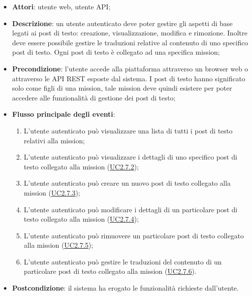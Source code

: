 \begin{itemize}
\item \textbf{Attori}: utente web, utente API;
\item \textbf{Descrizione}: un utente autenticato deve poter gestire gli aspetti di base legati ai post di testo: creazione, visualizzazione, modifica e rimozione. Inoltre deve essere possibile gestire le traduzioni relative al contenuto di uno specifico post di testo. Ogni post di testo è collegato ad una specifica mission; 
      \item \textbf{Precondizione}: l'utente accede alla piattaforma attraverso un browser web o attraverso le API REST esposte dal sistema. I post di testo hanno significato solo come figli di una mission, tale mission deve quindi esistere per poter accedere alle funzionalità di gestione dei post di testo;

        \item \textbf{Flusso principale degli eventi}:
          \begin{enumerate}
          \item L'utente autenticato può visualizzare una lista di tutti i post di testo relativi alla mission;
          \item L'utente autenticato può visualizzare i dettagli di uno specifico post di testo collegato alla mission (\hyperlink{UC2.7.2}{UC2.7.2});
          \item L'utente autenticato può creare un nuovo post di testo collegato alla mission (\hyperlink{UC2.7.3}{UC2.7.3});
          \item L'utente autenticato può modificare i dettagli di un particolare post di testo collegato alla mission (\hyperlink{UC2.7.4}{UC2.7.4});
          \item L'utente autenticato può rimuovere un particolare post di testo collegato alla mission (\hyperlink{UC2.7.5}{UC2.7.5});
          \item L'utente autenticato può gestire le traduzioni del contenuto di un particolare post di testo collegato alla mission (\hyperlink{UC2.7.6}{UC2.7.6}).

      \end{enumerate}
    \item \textbf{Postcondizione}: il sistema ha erogato le funzionalità richieste dall'utente.
  \end{itemize}

\hypertarget{UC2.7.2}{}
